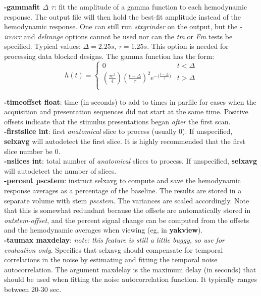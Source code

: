 \documentclass[10pt]{article}
\begin{document}
\noindent
{\bf -gammafit $\Delta$ $\tau$}: fit the amplitude of a gamma function
to each hemodynamic response.  The output file will then hold the
best-fit amplitude instead of the hemodynamic response.  One can still
run {\em stxgrinder} on the output, but the {\em -ircorr} and {\em
delrange} options cannot be used nor can the {\em tm} or {\em Fm}
tests be specified.  Typical values: $\Delta = 2.25s$, $\tau = 1.25s$.
This option is needed for processing data blocked designs.
The gamma function has the form:
\begin{equation}
h(t) = 
\begin{cases}
0 & t < \Delta \\
(\frac{\tau e^2}{4})
( \frac{t-\Delta}{\tau} )^2 e^{{-(\frac{t-\Delta}{\tau}})} & t > \Delta \\
\end{cases}
\label{hideal.eqn}
\end{equation}

\noindent
{\bf -timeoffset float}: time (in seconds) to add to times in parfile
for cases when the acquisition and presentation sequences did not
start at the same time.  Positive offsets indicate that the stimulus
presentations began {\em after} the first scan.\\

\noindent
{\bf -firstslice int}: first {\em anatomical} slice to process (usually 0).
If unspecified, {\bf selxavg} will autodetect the first slice.  It is
highly recommended that the first slice number be 0.\\

\noindent
{\bf -nslices int}: total number of {\em anatomical} slices to
process.  If unspecified, {\bf selxavg} will autodetect the number of
slices.\\

\noindent
{\bf -percent pscstem}: instruct selxavg to compute and save the
hemodynamic response averages as a percentage of the baseline. The
results are stored in a separate volume with stem {\em pscstem}.  The
variances are scaled accordingly. Note that this is somewhat redundant
because the offsets are automatically stored in {\em outstem-offset},
and the percent signal change can be computed from the offsets and the
hemodynamic averages when viewing (eg, in {\bf yakview}).\\

\noindent
{\bf -taumax maxdelay}: {\em note: this feature is still a little
buggy, so use for evaluation only}. Specifies that selxavg should
compensate for temporal correlations in the noise by estimating and
fitting the temporal noise autocorrelation. The argument maxdelay is
the maximum delay (in seconds) that should be used when fitting the
noise autocorrelation function. It typically ranges between 20-30
sec.\\
\end{document}
